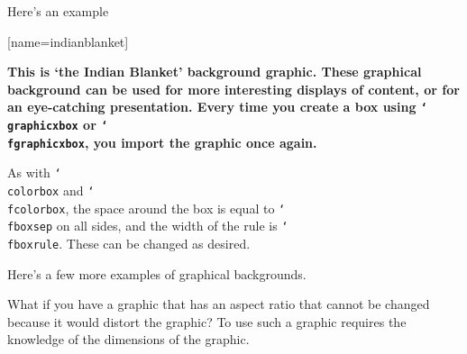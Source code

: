 \documentclass{article}
\newcommand{\cs}[1]{\texttt{\char`\\#1}}
\begin{document}
Here's an example

\begin{center}
[name=indianblanket]{}{%
  \begin{minipage}{.67\linewidth-2\fboxsep} %
  \footnotesize\bfseries\color{red}This is `the Indian Blanket' background
  graphic. These graphical background can be used for more interesting displays
  of content, or for an eye-catching presentation. Every time you create a
  box using \cs{graphicxbox} or \cs{fgraphicxbox}, you import the graphic once again.
  \end{minipage}}
\end{center}

As with \cs{colorbox} and \cs{fcolorbox}, the space around the box is equal to
\cs{fboxsep} on all sides, and the width of the rule is \cs{fboxrule}. These can
be changed as desired.

Here's a few more examples of graphical backgrounds.

\begin{center}
\end{center}


\begin{center}
\end{center}

What if you have a graphic that has an aspect ratio that cannot be changed
because it would distort the graphic? To use such a graphic requires the knowledge
of the dimensions of the graphic.
\end{document}
